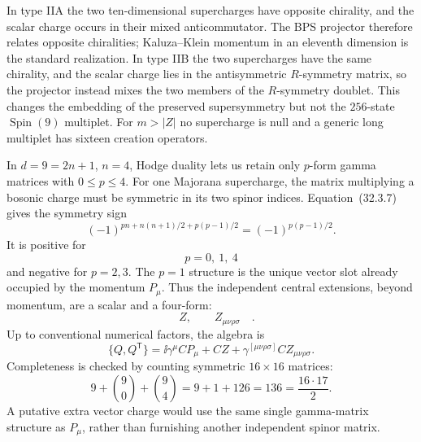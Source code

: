 \begin{enumerate}
  In type IIA the two ten-dimensional supercharges have opposite
  chirality, and the scalar charge occurs in their mixed
  anticommutator.  The BPS projector therefore relates opposite
  chiralities; Kaluza--Klein momentum in an eleventh dimension is the
  standard realization.  In type IIB the two supercharges have the
  same chirality, and the scalar charge lies in the antisymmetric
  \(R\)-symmetry matrix, so the projector instead mixes the two
  members of the \(R\)-symmetry doublet.  This changes the embedding
  of the preserved supersymmetry but not the \(256\)-state
  \(\operatorname{Spin}(9)\) multiplet.  For \(m>|Z|\) no supercharge is null and a
  generic long multiplet has sixteen creation operators.

  In \(d=9=2n+1\), \(n=4\), Hodge duality lets us retain only
  \(p\)-form gamma matrices with \(0\leq p\leq4\).  For one Majorana
  supercharge, the matrix multiplying a bosonic charge must be
  symmetric in its two spinor indices.  Equation~(32.3.7) gives the
  symmetry sign
  \[
    (-1)^{pn+n(n+1)/2+p(p-1)/2}
      =(-1)^{p(p-1)/2}.
  \]
  It is positive for
  \[
    p=0,\ 1,\ 4
  \]
  and negative for \(p=2,3\).  The \(p=1\) structure is the unique
  vector slot already occupied by the momentum \(P_\mu\).  Thus the
  independent central extensions, beyond momentum, are a scalar and
  a four-form:
  \[
    \boxed{\quad Z,\qquad Z_{\mu\nu\rho\sigma}\quad}.
  \]
  Up to conventional numerical factors, the algebra is
  \[
    \{Q,Q^{\mathsf T}\}
      =\ii\gamma^\mu C P_\mu
       +C Z
       +\gamma^{[\mu\nu\rho\sigma]}C
          Z_{\mu\nu\rho\sigma}.
  \]
  Completeness is checked by counting symmetric \(16\times16\)
  matrices:
  \[
    9+\binom90+\binom94
      =9+1+126
      =136
      =\frac{16\cdot17}{2}.
  \]
  A putative extra vector charge would use the same single gamma-matrix
  structure as \(P_\mu\), rather than furnishing another independent
  spinor matrix.
\end{enumerate}

